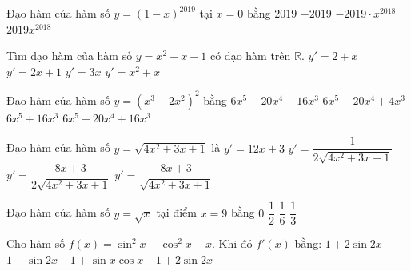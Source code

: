 \begin{ex}%
	Đạo hàm của hàm số $y=(1-x)^{2019}$ tại  $x=0$ bằng
	\choice 
		{$2019$} 
		{\True $-2019$} 
		{$-2019\cdot  x^{2018}$}
		{$2019x^{2018}$} 
\end{ex}

\begin{ex}%
	Tìm đạo hàm của hàm số $y =  x^2 +x +1$ có đạo hàm trên $\mathbb{R}$.
	 \choice
		{$y'=2+x$} 
		{\True  $y'=2x+1$}
		{$y'=3x$} 
		{$y'=x^2+x$} 
\end{ex}

\begin{ex}%
	Đạo hàm của hàm số $y=\left( x^3-2x^2  \right)^2$ bằng
	\choice 
		 {$6x^5-20x^4-16x^3$}
		{$6x^5-20x^4+4x^3$} 
		{$6x^5+16x^3$} 
		{\True  $6x^5-20x^4+16x^3$}
\end{ex}

\begin{ex}%
	Đạo hàm  của hàm số $y=\sqrt{4x^2+3x+1}$ là
	\choice 
		 {$y'=12x+3$}
		{$y'=\dfrac{1}{2\sqrt{4x^2+3x+1}}$} 
		{\True  $y'=\dfrac{8x+3}{2\sqrt{4x^2+3x+1}}$}
		 {$y'=\dfrac{8x+3}{\sqrt{4x^2+3x+1}}$}
\end{ex}

\begin{ex}%
	Đạo hàm của hàm số $y=\sqrt{x}$  tại điểm $x=9$ bằng
	 \choice
		 {$0$}
		 {$\dfrac{1}{2}$}
		{\True  $\dfrac{1}{6}$}
		{$\dfrac{1}{3}$} 
\end{ex}

\begin{ex}%
	Cho hàm số $f(x)=\sin^2{x}-\cos^2{x}-x$. Khi  đó $f'(x)$ bằng:
	\choice 
		 {$1+2\sin{2x}$}
		 {$1-\sin{2x}$}
		 {$-1+\sin{x}\cos{x}$}
		 {\True $-1+2\sin{2x}$}
\end{ex}


